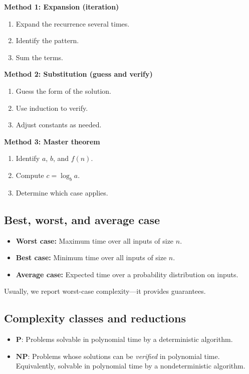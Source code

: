 \begin{strategy}
\textbf{Method 1: Expansion (iteration)}
\begin{enumerate}
  \item Expand the recurrence several times.
  \item Identify the pattern.
  \item Sum the terms.
\end{enumerate}

\textbf{Method 2: Substitution (guess and verify)}
\begin{enumerate}
  \item Guess the form of the solution.
  \item Use induction to verify.
  \item Adjust constants as needed.
\end{enumerate}

\textbf{Method 3: Master theorem}
\begin{enumerate}
  \item Identify $a$, $b$, and $f(n)$.
  \item Compute $c = \log_b a$.
  \item Determine which case applies.
\end{enumerate}
\end{strategy}

\subsection*{Best, worst, and average case}

\begin{definition}
\begin{itemize}
  \item \textbf{Worst case:} Maximum time over all inputs of size $n$.
  \item \textbf{Best case:} Minimum time over all inputs of size $n$.
  \item \textbf{Average case:} Expected time over a probability distribution on inputs.
\end{itemize}
Usually, we report worst-case complexity---it provides guarantees.
\end{definition}

\subsection*{Complexity classes and reductions}

\begin{definition}[P and NP]
\begin{itemize}
  \item $\mathbf{P}$: Problems solvable in polynomial time by a deterministic algorithm.
  \item $\mathbf{NP}$: Problems whose solutions can be \emph{verified} in polynomial time. Equivalently, solvable in polynomial time by a nondeterministic algorithm.
\end{itemize}
\end{definition}


